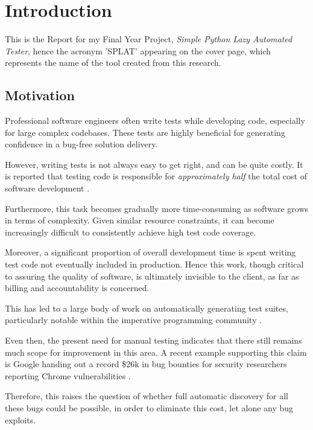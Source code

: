 \chapter{Introduction}
This is the Report for my Final Year Project, \emph{Simple Python Lazy Automated Tester}, hence the acronym '\textsf{SPLAT}' appearing on the cover page, which represents the name of the tool created from this research.
\section{Motivation}	%
Professional software engineers often write tests while developing code, especially for large complex codebases. These tests are highly beneficial for generating confidence in a bug-free solution delivery.

However, writing tests is not always easy to get right, and can be quite costly. It is reported that testing code is responsible for \emph{approximately half} the total cost of software development \cite{Edvardsson99asurvey}\cite{Han2008}\cite{Korel2005}.

Furthermore, this task becomes gradually more time-consuming as software grows in terms of complexity. Given similar resource constraints, it can become increasingly difficult to consistently achieve high test code coverage.

Moreover, a significant proportion of overall development time is spent writing test code not eventually included in production. Hence this work, though critical to assuring the quality of software\cite{Harrold00}, is ultimately invisible to the client, as far as billing and accountability is concerned.

This has led to a large body of work on automatically generating test suites, particularly notable within the imperative programming community \cite{Allwood2011}.

Even then, the present need for manual testing indicates that there still remains much scope for improvement in this area. A recent example supporting this claim is Google handing out a record \$26k in bug bounties for security researchers reporting Chrome vulnerabilities \cite{ChromeBugBounties}.

Therefore, this raises the question of whether full automatic discovery \cite{Bertolino2007} for all these bugs could be possible, in order to eliminate this cost, let alone any bug exploits.
